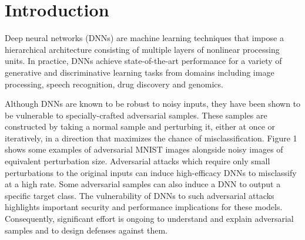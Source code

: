 \section{Introduction}

Deep neural networks (DNNs) are machine learning techniques that impose a hierarchical architecture consisting
of multiple layers of nonlinear processing units. In practice, DNNs achieve state-of-the-art
performance for a variety of generative and discriminative learning tasks from
domains including image processing, speech recognition, drug discovery and
genomics.

Although DNNs are known to be robust to noisy inputs, they have
been shown to be vulnerable to specially-crafted adversarial samples.
These samples are constructed by taking a normal
sample and perturbing it, either at once or iteratively, in a direction that
maximizes the chance of misclassification. Figure 1 shows
some examples of adversarial MNIST images alongside noisy images of equivalent
perturbation size. Adversarial attacks which require only small perturbations to
the original inputs can induce high-efficacy DNNs to misclassify at a high rate.
Some adversarial samples can also induce a DNN to output a specific target class.
The vulnerability of DNNs to such adversarial attacks
highlights important security and performance implications for these models.
Consequently, significant effort is ongoing to understand
and explain adversarial samples and to design defenses against them.
